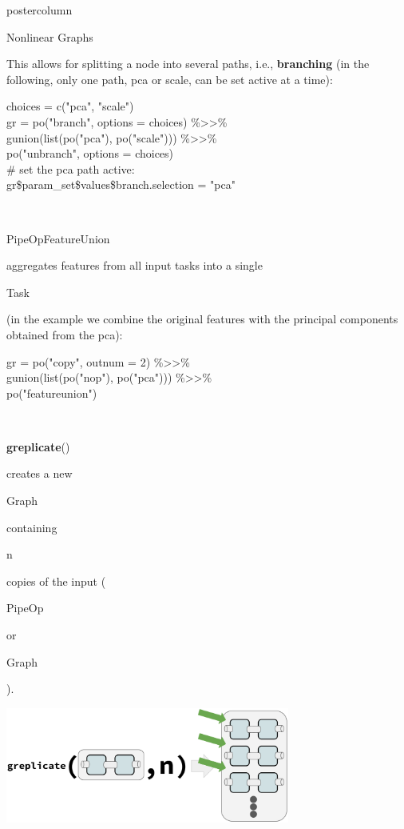\documentclass{beamer}
\newcommand{\codeinline}[1]{\begin{codeboxinline}#1\end{codeboxinline}}
\begin{document}
\begin{frame}[fragile]{}
\begin{columns}
\begin{column}{.245\textwidth}
\begin{beamercolorbox}[center]{postercolumn}
\begin{minipage}{.98\textwidth}
{\begin{myblock}{Nonlinear Graphs}
\begin{center}
              \end{center}
              This allows for splitting a node into several paths, i.e., \textbf{branching} (in the following, only one path, pca or scale, can be set active at a time):
              \begin{codeboxexample}
						    {\footnotesize
                  choices = c("pca", "scale")\\
                  gr = po("branch", options = choices) \%>{}>\%\\
                  \hspace*{1ex} gunion(list(po("pca"), po("scale"))) \%>{}>\%\\
                  \hspace*{1ex} po("unbranch", options = choices)\\
                  \# set the pca path active:\\
                  gr\$param\_set\$values\$branch.selection = "pca"}
					      \end{codeboxexample}
              \ \\
              \codeinline{PipeOpFeatureUnion} aggregates features from all input tasks into a single \codeinline{Task} (in the example we combine the original features with the principal components obtained from the pca):
              \begin{codeboxexample}
						    {\footnotesize
                  gr = po("copy", outnum = 2) \%>{}>\%\\
                  \hspace*{1ex} gunion(list(po("nop"), po("pca"))) \%>{}>\%\\
                  \hspace*{1ex} po("featureunion")}
              \end{codeboxexample}
              \ \\
              \codeinline{\textbf{greplicate}()} creates a new \codeinline{Graph} containing \codeinline{n} copies of the input (\codeinline{PipeOp} or \codeinline{Graph}).
              \begin{center}
                \includegraphics[width=0.7\textwidth]{img/greplicate.pdf}

\end{center}
\end{myblock}}
\end{minipage}
\end{beamercolorbox}
\end{column}
\end{columns}
\end{frame}
\end{document}
